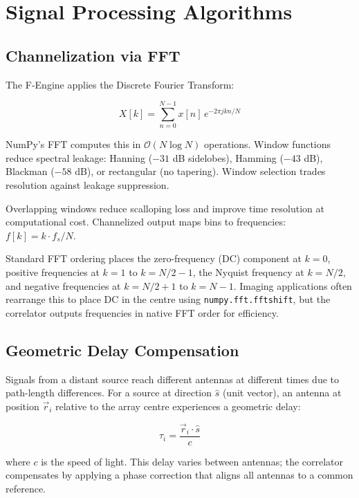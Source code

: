 \section{Signal Processing Algorithms}

\subsection{Channelization via FFT}

The F-Engine applies the Discrete Fourier Transform:

\begin{equation}
    X[k] = \sum_{n=0}^{N-1} x[n] \, e^{-2\pi j kn / N}
\end{equation}

NumPy's FFT computes this in $\mathcal{O}(N \log N)$ operations. Window functions reduce spectral leakage: Hanning ($-31$ dB sidelobes), Hamming ($-43$ dB), Blackman ($-58$ dB), or rectangular (no tapering). Window selection trades resolution against leakage suppression.

Overlapping windows reduce scalloping loss and improve time resolution at computational cost. Channelized output maps bins to frequencies: $f[k] = k \cdot f_s / N$.

Standard FFT ordering places the zero-frequency (DC) component at $k=0$, positive frequencies at $k=1$ to $k=N/2-1$, the Nyquist frequency at $k=N/2$, and negative frequencies at $k=N/2+1$ to $k=N-1$. Imaging applications often rearrange this to place DC in the centre using \texttt{numpy.fft.fftshift}, but the correlator outputs frequencies in native FFT order for efficiency.

\subsection{Geometric Delay Compensation}

Signals from a distant source reach different antennas at different times due to path-length differences. For a source at direction $\hat{s}$ (unit vector), an antenna at position $\vec{r}_i$ relative to the array centre experiences a geometric delay:

\begin{equation}
    \tau_i = \frac{\vec{r}_i \cdot \hat{s}}{c}
\end{equation}

where $c$ is the speed of light. This delay varies between antennas; the correlator compensates by applying a phase correction that aligns all antennas to a common reference.

